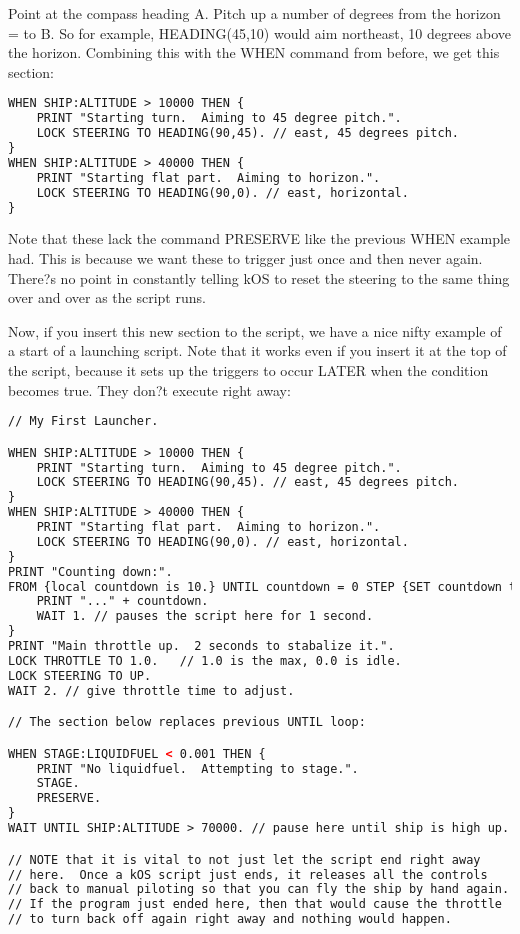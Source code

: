 Point at the compass heading A.
Pitch up a number of degrees from the horizon = to B.
So for example, HEADING(45,10) would aim northeast, 10 degrees above the horizon. Combining this with the WHEN command from before, we get this section:

\begin{lstlisting}[frame=single,language=XML]
WHEN SHIP:ALTITUDE > 10000 THEN {
    PRINT "Starting turn.  Aiming to 45 degree pitch.".
    LOCK STEERING TO HEADING(90,45). // east, 45 degrees pitch.
}
WHEN SHIP:ALTITUDE > 40000 THEN {
    PRINT "Starting flat part.  Aiming to horizon.".
    LOCK STEERING TO HEADING(90,0). // east, horizontal.
}
\end{lstlisting} 

Note that these lack the command PRESERVE like the previous WHEN example had. This is because we want these to trigger just once and then never again. There?s no point in constantly telling kOS to reset the steering to the same thing over and over as the script runs.

Now, if you insert this new section to the script, we have a nice nifty example of a start of a launching script. Note that it works even if you insert it at the top of the script, because it sets up the triggers to occur LATER when the condition becomes true. They don?t execute right away:

\begin{lstlisting}[frame=single,language=XML]
// My First Launcher.

WHEN SHIP:ALTITUDE > 10000 THEN {
    PRINT "Starting turn.  Aiming to 45 degree pitch.".
    LOCK STEERING TO HEADING(90,45). // east, 45 degrees pitch.
}
WHEN SHIP:ALTITUDE > 40000 THEN {
    PRINT "Starting flat part.  Aiming to horizon.".
    LOCK STEERING TO HEADING(90,0). // east, horizontal.
}
PRINT "Counting down:".
FROM {local countdown is 10.} UNTIL countdown = 0 STEP {SET countdown to countdown - 1.} DO {
    PRINT "..." + countdown.
    WAIT 1. // pauses the script here for 1 second.
}
PRINT "Main throttle up.  2 seconds to stabalize it.".
LOCK THROTTLE TO 1.0.   // 1.0 is the max, 0.0 is idle.
LOCK STEERING TO UP.
WAIT 2. // give throttle time to adjust.

// The section below replaces previous UNTIL loop:

WHEN STAGE:LIQUIDFUEL < 0.001 THEN {
    PRINT "No liquidfuel.  Attempting to stage.".
    STAGE.
    PRESERVE.
}
WAIT UNTIL SHIP:ALTITUDE > 70000. // pause here until ship is high up.

// NOTE that it is vital to not just let the script end right away
// here.  Once a kOS script just ends, it releases all the controls
// back to manual piloting so that you can fly the ship by hand again.
// If the program just ended here, then that would cause the throttle
// to turn back off again right away and nothing would happen.
\end{lstlisting} 

